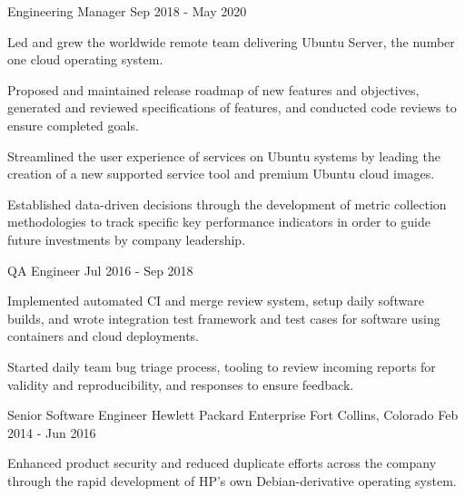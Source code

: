 \begin{cventries}
  \cventry
    {Engineering Manager}
    {}
    {}
    {Sep 2018 - May 2020}
    {
      \begin{cvitems}
        \item {
          Led and grew the worldwide remote team delivering Ubuntu Server,
          the number one cloud operating system.
        }
        \item {
          Proposed and maintained release roadmap of new features and
          objectives, generated and reviewed specifications of features, and
          conducted code reviews to ensure completed goals.
        }
        \item {
          Streamlined the user experience of services on Ubuntu systems by
          leading the creation of a new supported service tool and premium
          Ubuntu cloud images.
        }
        \item {
          Established data-driven decisions through the development of metric
          collection methodologies to track specific key performance
          indicators in order to guide future investments by company
          leadership.
        }
      \end{cvitems}
    }
    {}

  \cventry
    {QA Engineer}
    {}
    {}
    {Jul 2016 - Sep 2018}
    {
      \begin{cvitems}
        \item {
          Implemented automated CI and merge review system, setup daily
          software builds, and wrote integration test framework and test
          cases for software using containers and cloud deployments.
        }
        \item {
          Started daily team bug triage process, tooling to review
          incoming reports for validity and reproducibility, and responses
          to ensure feedback.
        }
      \end{cvitems}
    }
    {}

  \cventry
    {Senior Software Engineer}
    {Hewlett Packard Enterprise}
    {Fort Collins, Colorado}
    {Feb 2014 - Jun 2016}
    {}
    {
      \begin{cvitems}
        \item {
          Enhanced product security and reduced duplicate efforts across the
          company through the rapid development of HP's own Debian-derivative
          operating system.
        }
      \end{cvitems}
    }


\end{cventries}
